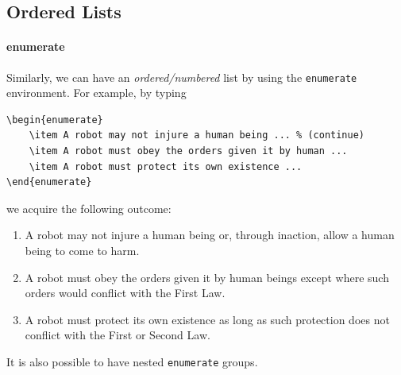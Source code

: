 \subsection{Ordered Lists}

\paragraph{enumerate}
Similarly, we can have an \textit{ordered/numbered} list by using the \verb|enumerate| environment. For example, by typing
\begin{lstlisting}
\begin{enumerate}
    \item A robot may not injure a human being ... % (continue)
    \item A robot must obey the orders given it by human ...
    \item A robot must protect its own existence ...
\end{enumerate}    
\end{lstlisting}
we acquire the following outcome:
\begin{enumerate}
    \item A robot may not injure a human being or, through inaction, allow a human being to come to harm.
    \item A robot must obey the orders given it by human beings except where such orders would conflict with the First Law.
    \item A robot must protect its own existence as long as such protection does not conflict with the First or Second Law.
\end{enumerate}
It is also possible to have nested \verb|enumerate| groups.

